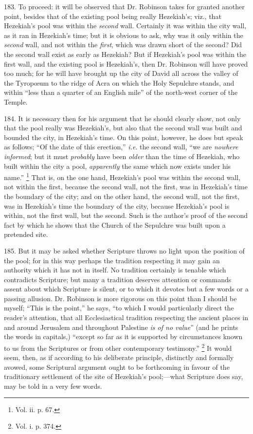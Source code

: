 183.
To proceed: it will be observed that Dr. Robinson takes for granted
another point, besides that of the existing pool being really Hezekiah's;
viz., that Hezekiah's pool was within the \emph{second} wall.
Certainly it was within the city wall, as it ran in Hezekiah's time;
but it is obvious to ask, why was it only within the \emph{second}
wall, and not within the \emph{first}, which was drawn short of
the second? Did the second wall exist as early as Hezekiah? But if
Hezekiah's pool was within the first wall, and the existing pool is Hezekiah's,
then Dr. Robinson will have proved too much; for he will have brought
up the city of David all across the valley of the Tyropœum to the
ridge of Acra on which the Holy Sepulchre stands, and within ``less
than a quarter of an English mile'' of the north-west corner of the
Temple.

184.
It is necessary then for his argument that he should clearly show, not
only that the pool really was Hezekiah's, but also that the second
wall was built and bounded the city, in Hezekiah's time. On this
point, however, he does but speak as follows; ``Of the date of this
erection,'' \emph{i.e}. the second wall, ``we are \emph{nowhere informed};
but it must \emph{probably} have been \emph{older} than the time of Hezekiah,
who built within the city a pool, \emph{apparently} the same which now
exists under his name.'' \footnote{Vol. ii. p. 67.}
That is, on the one hand, Hezekiah's pool was within the second wall,
not within the first, because the second wall, not the first, was in
Hezekiah's time the boundary of the city; and on the other hand, the
second wall, not the first, was in Hezekiah's time the boundary of the
city, because Hezekiah's pool is within, not the first wall, but the
second. Such is the author's proof of the second fact by which
he shows that the Church of the Sepulchre was built upon a pretended
site.

185.
But it may be asked whether Scripture throws no light upon the
position of the pool; for in this way perhaps the tradition respecting
it may gain an authority which it has not in itself. No tradition
certainly is tenable which contradicts Scripture; but many a tradition
deserves attention or commands assent about which Scripture is silent,
or to which it devotes but a few words or a passing allusion. Dr.
Robinson is more rigorous on this point than I should be myself;
``This is the point,'' he says, ``to which I would particularly
direct the reader's attention, that all Ecclesiastical tradition
respecting the ancient places in and around Jerusalem and throughout
Palestine \emph{is of no value}'' (and he prints the words in
capitals,) ``except so far as it is supported by circumstances known to
us from the Scriptures or from other contemporary testimony.'' \footnote{Vol. i. p. 374.} It would seem, then, as if according to his deliberate
principle, distinctly and formally avowed, some Scriptural argument
ought to be forthcoming in favour of the traditionary settlement of
the site of Hezekiah's pool;—what Scripture does say, may be told in
a very few words.

